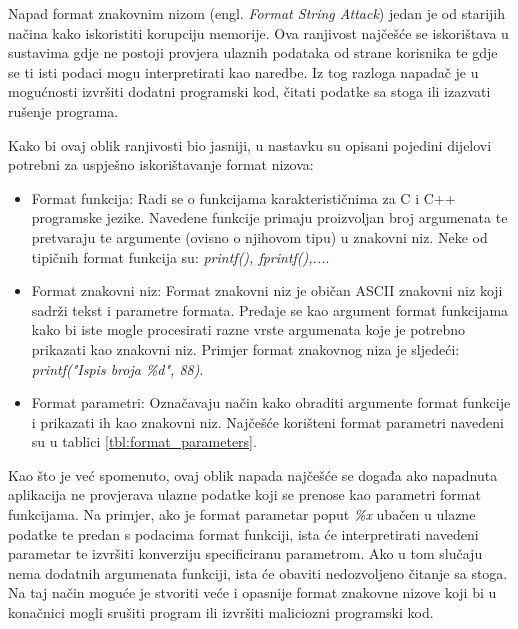 \documentclass[times, utf8, diplomski, numeric]{fer}
\begin{document}
Napad format znakovnim nizom (engl. \emph{Format String Attack}) 
jedan je od starijih načina kako iskoristiti korupciju memorije.
Ova ranjivost najčešće se iskorištava u sustavima gdje ne postoji
provjera ulaznih podataka od strane korisnika te gdje se ti isti
podaci mogu interpretirati kao naredbe. Iz tog razloga napadač je
u mogućnosti izvršiti dodatni programski kod, čitati podatke sa stoga ili
izazvati rušenje programa. 

Kako bi ovaj oblik ranjivosti bio jasniji, u nastavku su opisani
pojedini dijelovi potrebni za uspješno iskorištavanje format
nizova:

\begin{itemize}
\item Format funkcija: Radi se o funkcijama karakterističnima za
C i C++ programske jezike. Navedene funkcije primaju proizvoljan
broj argumenata te pretvaraju te argumente (ovisno o njihovom
tipu) u znakovni niz. Neke od tipičnih format funkcija su:
\emph{printf(), fprintf(),...}. 

\item Format znakovni niz: Format znakovni niz je običan ASCII
znakovni niz koji sadrži tekst i parametre formata. Predaje se
kao argument format funkcijama kako bi iste mogle procesirati				%
razne vrste argumenata koje je potrebno prikazati kao znakovni
niz. Primjer format znakovnog niza je sljedeći:
\emph{printf("Ispis broja \%d", 88)}.

\item Format parametri: Označavaju način kako obraditi argumente
format funkcije i prikazati ih kao znakovni niz. Najčešće
korišteni format parametri navedeni su u tablici 					%
\ref{tbl:format_parameters}.
\end{itemize}

Kao što je već spomenuto, ovaj oblik napada najčešće se događa
ako napadnuta aplikacija ne provjerava ulazne podatke koji se
prenose kao parametri format funkcijama. Na primjer, ako je
format parametar poput \emph{\%x} ubačen u ulazne podatke te
predan s podacima format funkciji, ista će interpretirati
navedeni parametar te izvršiti konverziju specificiranu
parametrom. Ako u tom slučaju nema dodatnih argumenata funkciji,
ista će obaviti nedozvoljeno čitanje sa stoga. Na taj način
moguće je stvoriti veće i opasnije format znakovne nizove koji bi
u konačnici mogli srušiti program ili izvršiti maliciozni programski kod.				%
\end{document}
